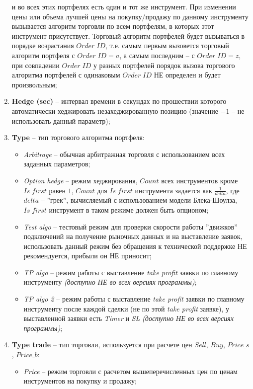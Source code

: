 \begin{enumerate}
		и во всех этих портфелях есть один и тот же инструмент. При изменении цены или объема лучшей цены на покупку/продажу по данному инструменту вызывается алгоритм
		торговли по всем портфелям, в которых этот инструмент присутствует. Торговый алгоритм портфелей будет вызываться в порядке возрастания $Order \; ID$, т.е. самым первым
		вызовется торговый алгоритм портфеля с $Order \; ID = a$, а самым последним -- с $Order \; ID = z$, при совпадении $Order \; ID$ у разных портфелей порядок вызова
		торгового алгоритма портфелей с одинаковым $Order \; ID$ НЕ определен и будет произвольным;
	\item \textbf{Hedge (sec)} -- интервал времени в секундах по прошествии которого автоматически хеджировать незахеджированную позицию (значение $-1$
		-- не использовать данный параметр);
	\item \textbf{Type} -- тип торгового алгоритма портфеля:
		\begin{itemize}
		\item \textit{Arbitrage} -- обычная арбитражная торговля с использованием всех заданных параметров;
		\item \textit{Option hedge} -- режим хеджирования, $Count$ всех инструментов кроме $Is \; first$ равен $1$, $Count$ для $Is \; first$ инструмента задается как
			$\frac{1}{delta}$, где $delta$ -- ''грек'', вычисляемый с использованием модели Блека-Шоулза, $Is \; first$ инструмент в таком режиме должен быть опционом;
		\item \textit{Test algo} -- тестовый режим для проверки скорости работы ''движков'' подключений на получение рыночных данных и на выставление заявок,
			использовать данный режим без обращения к технической поддержке НЕ рекомендуется, прибыли он НЕ приносит;
\ifdefined \Ramiz
		\item \textit{TP algo} -- режим работы с выставление \textit{take profit} заявки по главному инструменту \textit{(доступно НЕ во всех версиях программы)};
		\item \textit{TP algo 2} -- режим работы с выставление \textit{take profit} заявки по главному инструменту после каждой сделки (не по этой \textit{take profit}
			заявке), у выставленной заявки есть \textit{Timer} и \textit{SL} \textit{(доступно НЕ во всех версиях программы)};
\else
\fi
		\end{itemize}
	\item \textbf{Type trade} -- тип торговли, используется при расчете цен $Sell$, $Buy$, $Price\_s$, $Price\_b$:
		\begin{itemize}
		\item \textit{Price} -- режим торговли с расчетом вышеперечисленных цен по ценам инструментов на покупку и продажу;

\end{itemize}
\end{enumerate}
